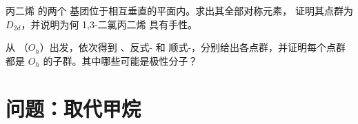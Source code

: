 \begin{exercise}[$\star\star\star$]\label{exo:b3:point-groups:11}
丙二烯  的两个  基团位于相互垂直的平面内。求出其全部对称元素，
证明其点群为 $D_{2d}$，并说明为何
1,3-二氯丙二烯  具有手性。
\end{exercise}

\begin{exercise}[$\star\star\star$]\label{exo:b3:point-groups:12}
从 （$O_h$）出发，依次得到 、反式- 和
顺式-，分别给出各点群，并证明每个点群都是
$O_h$ 的子群。其中哪些可能是极性分子？
\end{exercise}

\section{问题：取代甲烷}

